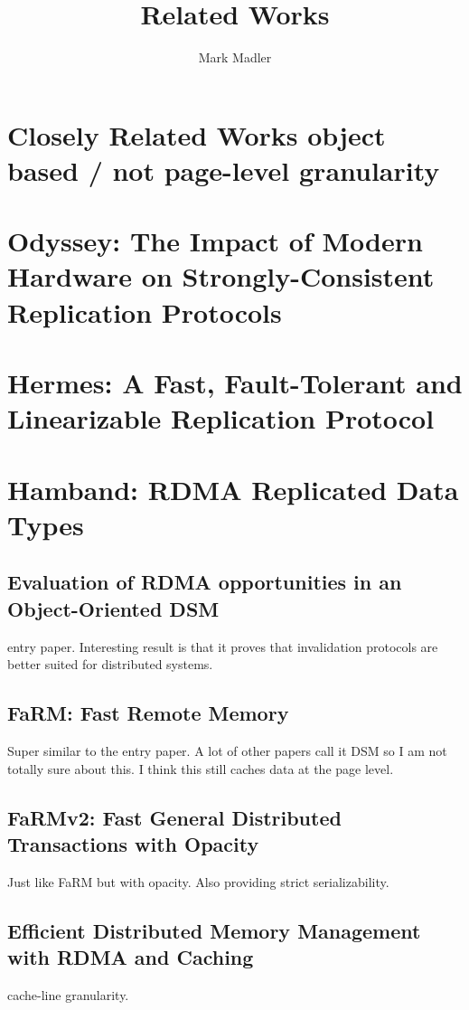\documentclass[sigplan,nonacm]{acmart}
\title{Related Works}
\author{Mark Madler}
\begin{document}
\maketitle
\section{Closely Related Works object based / not page-level granularity}
\section {Odyssey: The Impact of Modern Hardware on Strongly-Consistent Replication Protocols}

\section {Hermes: A Fast, Fault-Tolerant and Linearizable Replication Protocol}

\section {Hamband: RDMA Replicated Data Types}

\subsection{Evaluation of RDMA opportunities in an Object-Oriented DSM}
entry paper. Interesting result is that it proves that invalidation protocols are better suited 
for distributed systems. \cite{Veldema-LCPC-2007}

\subsection{FaRM: Fast Remote Memory}
Super similar to the entry paper. A lot of other papers call it DSM so 
I am not totally sure about this. I think this still caches data at the page level.\cite{Dragojevic-NSDI-2014}

\subsection{FaRMv2: Fast General Distributed Transactions with Opacity}
Just like FaRM but with opacity. Also providing strict serializability.\cite{Shamis-SIGMOD-2019}

\subsection{Efficient Distributed Memory Management with RDMA and Caching }
cache-line granularity.\cite{Cai-VLDB-2018}
\end{document}
